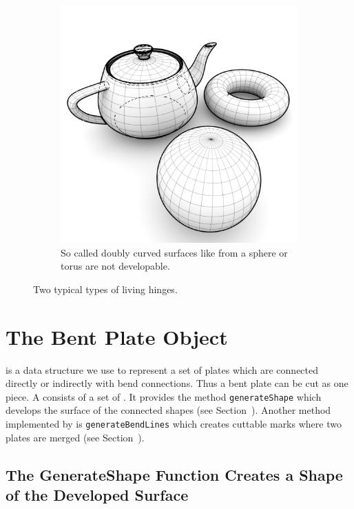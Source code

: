 \documentclass[../ClassicThesis.tex]{subfiles}
\begin{document}
\begin{figure}[h]
\begin{subfigure}[b]{0.49\textwidth}
    \includegraphics[width=1\textwidth]{07-not_developable_surfaces}
    \caption{So called doubly curved surfaces like from a sphere or torus are not developable.}
  \end{subfigure}
  \caption{Two typical types of living hinges.}
  \label{fig:developable_surface_examples}
\end{figure}

\section{The Bent Plate Object}

 is a data structure we use to represent a set of plates which are connected directly or indirectly with bend connections. Thus a bent plate can be cut as one piece. A  consists of a set of . It provides the method \texttt{generateShape} which develops the surface of the connected shapes (see Section~). Another method implemented by  is \texttt{generateBendLines} which creates cuttable marks where two plates are merged (see Section~).

\subsection{The GenerateShape Function Creates a Shape of the Developed Surface}
\label{sec:generateShape}
\end{document}
